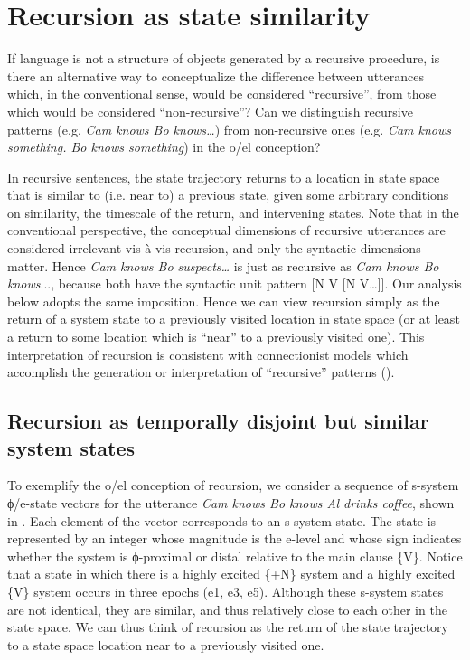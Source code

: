 \section{Recursion as state similarity}

If language is not a structure of objects generated by a recursive procedure, is there an alternative way to conceptualize the difference between utterances which, in the conventional sense, would be considered “recursive”, from those which would be considered “non-recursive”? Can we distinguish recursive patterns (e.g. \textit{Cam knows Bo knows…}) from non-recursive ones (e.g. \textit{Cam knows something. Bo knows something}) in the o/el conception? 

  In recursive sentences, the state trajectory returns to a location in state space that is similar to (i.e. near to) a previous state, given some arbitrary conditions on similarity, the timescale of the return, and intervening states. Note that in the conventional perspective, the conceptual dimensions of recursive utterances are considered irrelevant vis-à-vis recursion, and only the syntactic dimensions matter. Hence \textit{Cam knows Bo suspects…} is just as recursive as \textit{Cam knows Bo knows}..., because both have the syntactic unit pattern [N V [N V…]]. Our analysis below adopts the same imposition. Hence we can view recursion simply as the return of a system state to a previously visited location in state space (or at least a return to some location which is “near” to a previously visited one). This interpretation of recursion is consistent with connectionist models which accomplish the generation or interpretation of “recursive” patterns (\citealt{ChristiansenChater1999,Elman1989,Smolensky1990}).

\subsection{Recursion as temporally disjoint but similar system states}

To exemplify the o/el conception of recursion, we consider a sequence of s-system ϕ/e-state vectors for the utterance \textit{Cam knows Bo knows Al drinks coffee}, shown in {}. Each element of the vector corresponds to an s-system state. The state is represented by an integer whose magnitude is the e-level and whose sign indicates whether the system is ϕ-proximal or distal relative to the main clause \{V\}. Notice that a state in which there is a highly excited \{+N\} system and a highly excited \{V\} system occurs in three epochs (e1, e3, e5). Although these s-system states are not identical, they are similar, and thus relatively close to each other in the state space. We can thus think of recursion as the return of the state trajectory to a state space location near to a previously visited one.

